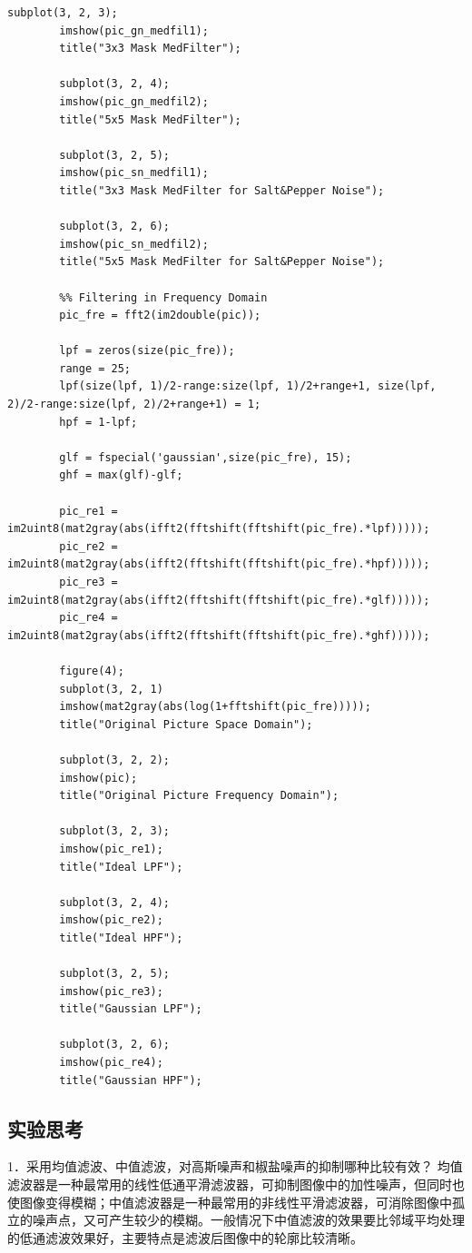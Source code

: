 \documentclass[UTF8]{article} %
\begin{document}
\begin{lstlisting}[style=Matlab-editor]
		subplot(3, 2, 3);
		imshow(pic_gn_medfil1);
		title("3x3 Mask MedFilter");
		
		subplot(3, 2, 4);
		imshow(pic_gn_medfil2);
		title("5x5 Mask MedFilter");
		
		subplot(3, 2, 5);
		imshow(pic_sn_medfil1);
		title("3x3 Mask MedFilter for Salt&Pepper Noise");
		
		subplot(3, 2, 6);
		imshow(pic_sn_medfil2);
		title("5x5 Mask MedFilter for Salt&Pepper Noise");
		
		%% Filtering in Frequency Domain
		pic_fre = fft2(im2double(pic));
		
		lpf = zeros(size(pic_fre));
		range = 25;
		lpf(size(lpf, 1)/2-range:size(lpf, 1)/2+range+1, size(lpf, 2)/2-range:size(lpf, 2)/2+range+1) = 1;
		hpf = 1-lpf;
		
		glf = fspecial('gaussian',size(pic_fre), 15);
		ghf = max(glf)-glf;
		
		pic_re1 = im2uint8(mat2gray(abs(ifft2(fftshift(fftshift(pic_fre).*lpf)))));
		pic_re2 = im2uint8(mat2gray(abs(ifft2(fftshift(fftshift(pic_fre).*hpf)))));
		pic_re3 = im2uint8(mat2gray(abs(ifft2(fftshift(fftshift(pic_fre).*glf)))));
		pic_re4 = im2uint8(mat2gray(abs(ifft2(fftshift(fftshift(pic_fre).*ghf)))));
		
		figure(4);
		subplot(3, 2, 1)
		imshow(mat2gray(abs(log(1+fftshift(pic_fre)))));
		title("Original Picture Space Domain");
		
		subplot(3, 2, 2);
		imshow(pic);
		title("Original Picture Frequency Domain");
		
		subplot(3, 2, 3);
		imshow(pic_re1);
		title("Ideal LPF");
		
		subplot(3, 2, 4);
		imshow(pic_re2);
		title("Ideal HPF");
		
		subplot(3, 2, 5);
		imshow(pic_re3);
		title("Gaussian LPF");
		
		subplot(3, 2, 6);
		imshow(pic_re4);
		title("Gaussian HPF");
	\end{lstlisting}
	
	\subsection{实验思考}
	1．采用均值滤波、中值滤波，对高斯噪声和椒盐噪声的抑制哪种比较有效？
	均值滤波器是一种最常用的线性低通平滑滤波器，可抑制图像中的加性噪声，但同时也使图像变得模糊；中值滤波器是一种最常用的非线性平滑滤波器，可消除图像中孤立的噪声点，又可产生较少的模糊。一般情况下中值滤波的效果要比邻域平均处理的低通滤波效果好，主要特点是滤波后图像中的轮廓比较清晰。
	
\end{document}
